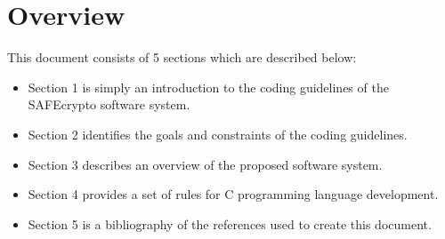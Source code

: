 \section{Overview}
This document consists of 5 sections which are described below:

\begin{itemize}
\item Section 1 is simply an introduction to the coding guidelines of the SAFEcrypto software system.
\item Section 2 identifies the goals and constraints of the coding guidelines.
\item Section 3 describes an overview of the proposed software system.
\item Section 4 provides a set of rules for C programming language development.
\item Section 5 is a bibliography of the references used to create this document.
\end{itemize}

